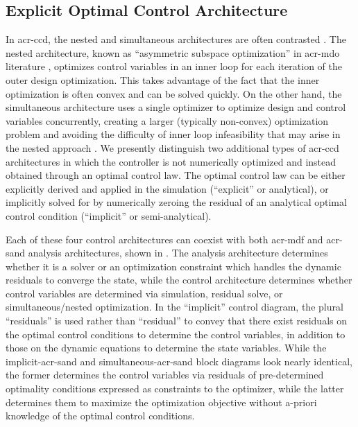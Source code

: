\subsection{Explicit Optimal Control Architecture}
\ifdefined\DISSERTATION
    In \gls{acr-ccd}, the nested and simultaneous architectures are often contrasted \citep{sundarrajan_towards_2021,herber_nested_2018}.
    The nested architecture, known as ``asymmetric subspace optimization'' in \gls{acr-mdo} literature \citep{chittick_asymmetric_2009}, optimizes control variables in an inner loop for each iteration of the outer design optimization.
    This takes advantage of the fact that the inner optimization is often convex and can be solved quickly.
    On the other hand, the simultaneous architecture uses a single optimizer to optimize design and control variables concurrently, creating a larger (typically non-convex) optimization problem and avoiding the difficulty of inner loop infeasibility that may arise in the nested approach \citep{herber_nested_2018}. 
    We presently distinguish two additional types of \gls{acr-ccd} architectures in which the controller is not numerically optimized and instead obtained through an optimal control law.
    The optimal control law can be either explicitly derived and applied in the simulation (``explicit'' or analytical), or implicitly solved for by numerically zeroing the residual of an analytical optimal control condition (``implicit'' or semi-analytical).
    
    Each of these four control architectures can coexist with both \gls{acr-mdf} and \gls{acr-sand} analysis architectures, shown in .
    The analysis architecture determines whether it is a solver or an optimization constraint which handles the dynamic residuals to converge the state, while the control architecture determines whether control variables are determined via simulation, residual solve, or simultaneous/nested optimization.
    In the ``implicit'' control diagram, the plural ``residuals'' is used rather than ``residual'' to convey that there exist residuals on the optimal control conditions to determine the control variables, in addition to those on the dynamic equations to determine the state variables.
    While the implicit-\gls{acr-sand} and simultaneous-\gls{acr-sand} block diagrams look nearly identical, the former determines the control variables via residuals of pre-determined optimality conditions expressed as constraints to the optimizer, while the latter determines them to maximize the optimization objective without a-priori knowledge of the optimal control conditions.
    

